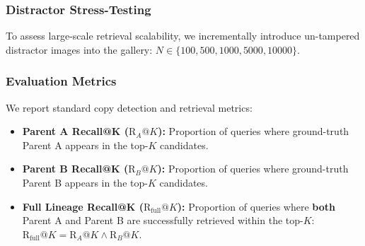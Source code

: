 \documentclass[journal]{IEEEtran}
\begin{document}
\subsubsection{Distractor Stress-Testing}
To assess large-scale retrieval scalability, we incrementally introduce un-tampered distractor images into the gallery: $N \in \{100, 500, 1000, 5000, 10000\}$.

\subsubsection{Evaluation Metrics}
We report standard copy detection and retrieval metrics:
\begin{itemize}
    \item \textbf{Parent A Recall@K ($\text{R}_A@K$):} Proportion of queries where ground-truth Parent A appears in the top-$K$ candidates.
    \item \textbf{Parent B Recall@K ($\text{R}_B@K$):} Proportion of queries where ground-truth Parent B appears in the top-$K$ candidates.
    \item \textbf{Full Lineage Recall@K ($\text{R}_{\text{full}}@K$):} Proportion of queries where \textbf{both} Parent A and Parent B are successfully retrieved within the top-$K$: $\text{R}_{\text{full}}@K = \text{R}_A@K \wedge \text{R}_B@K$.
\end{itemize}
\end{document}
